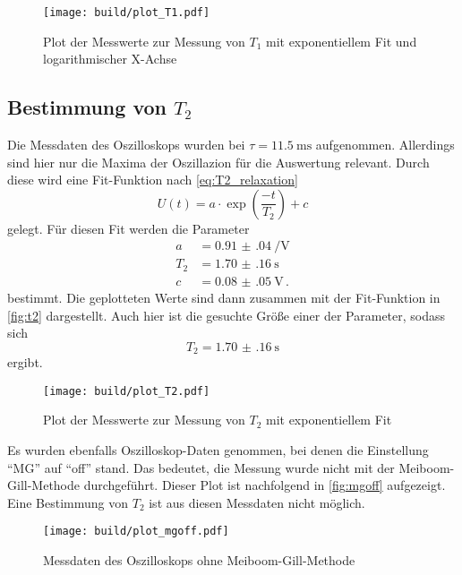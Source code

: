 \begin{figure}
    \centering
    \texttt{[image: build/plot\_T1.pdf]}
    \caption{Plot der Messwerte zur Messung von $T_1$ mit exponentiellem Fit und logarithmischer X-Achse}
    \label{fig:t1}
\end{figure}

\subsection{Bestimmung von \texorpdfstring{$T_2$}{T2}}
\label{ssec:aus2}

Die Messdaten des Oszilloskops wurden bei $\tau = \SI{11.5}{\milli\second}$ aufgenommen.
Allerdings sind hier nur die Maxima der Oszillazion für die Auswertung relevant.
Durch diese wird eine Fit-Funktion nach \autoref{eq:T2_relaxation}
\begin{equation}
    U(t) = a \cdot \exp(\frac{- t}{T_2}) + c 
    \label{eq:fit_t2}
\end{equation}
gelegt.
Für diesen Fit werden die Parameter 
\begin{align*}
    a &= \SI{0.91(04)}{\per\volt} \\
    T_2 &= \SI{1.70(16)}{\second} \\
    c &= \SI{0.08(05)}{\volt} \, .
\end{align*}
bestimmt.
Die geplotteten Werte sind dann zusammen mit der Fit-Funktion in \autoref{fig:t2} dargestellt.
Auch hier ist die gesuchte Größe einer der Parameter, sodass sich 
\begin{equation}
    T_2 = \SI{1.70(16)}{\second} 
    \label{eq:t2_wert}
\end{equation}
ergibt.
\begin{figure}
    \centering
    \texttt{[image: build/plot\_T2.pdf]}
    \caption{Plot der Messwerte zur Messung von $T_2$ mit exponentiellem Fit}
    \label{fig:t2}
\end{figure}

Es wurden ebenfalls Oszilloskop-Daten genommen, bei denen die Einstellung \enquote{MG} auf \enquote{off} stand.
Das bedeutet, die Messung wurde nicht mit der Meiboom-Gill-Methode durchgeführt.
Dieser Plot ist nachfolgend in \autoref{fig:mgoff} aufgezeigt.
Eine Bestimmung von $T_2$ ist aus diesen Messdaten nicht möglich.

\begin{figure}
    \centering
    \texttt{[image: build/plot\_mgoff.pdf]}
    \caption{Messdaten des Oszilloskops ohne Meiboom-Gill-Methode}
    \label{fig:mgoff}
\end{figure}

